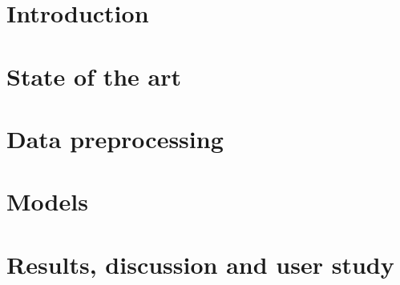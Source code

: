 \documentclass[11pt, a4paper]{article}
\begin{document}






\newpage

\section{Introduction}



\section{State of the art}



\section{Data preprocessing}



\section{Models}



\section{Results, discussion and user study}





\newpage

\printbibliography%
\end{document}
